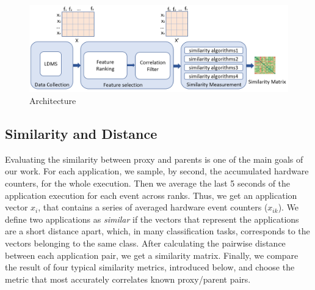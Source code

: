 \begin{figure}[ht]
\centering
\includegraphics[width=\linewidth]{figs/SimEngine.png}
\caption{\us Architecture }
\label{figs:us}
\end{figure}

\subsection{Similarity and Distance}
\label{sec:Sim}

Evaluating the similarity between proxy and parents is one of the main goals of our work.
For each application, we sample, by second, the accumulated hardware counters, for the whole execution. Then we average the last 5 seconds of the application execution for each event across ranks. Thus, we get an application vector $x_{i}$, that contains a series of averaged hardware event counters (\ie $x_{ik}$). 
We define two applications as \emph{similar} if the vectors that represent the applications are a short distance apart, which, in many classification tasks, corresponds to the vectors belonging to the same class. %
After calculating the pairwise distance between each application pair, we get a similarity matrix. %
Finally, we compare the result of four typical similarity metrics, introduced below, and choose the metric that most accurately correlates known proxy/parent pairs. 

